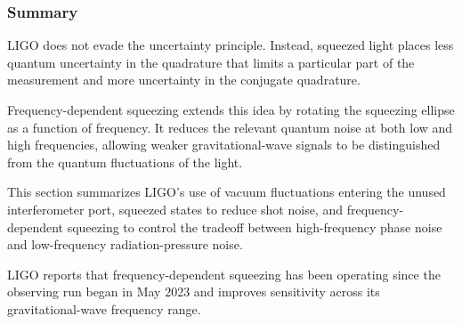 \subsubsection{Summary}

LIGO does not evade the uncertainty principle. Instead, squeezed light
places less quantum uncertainty in the quadrature that limits a particular
part of the measurement and more uncertainty in the conjugate quadrature.

Frequency-dependent squeezing extends this idea by rotating the squeezing
ellipse as a function of frequency. It reduces the relevant quantum noise at
both low and high frequencies, allowing weaker gravitational-wave signals to
be distinguished from the quantum fluctuations of the light.


This section summarizes LIGO’s use of vacuum fluctuations entering the unused interferometer port, 
squeezed states to reduce shot noise, and frequency-dependent squeezing to control the tradeoff between high-frequency phase noise 
and low-frequency radiation-pressure noise.

LIGO reports that frequency-dependent squeezing has been operating since the observing run began in May 2023 
and improves sensitivity across its gravitational-wave frequency range.



